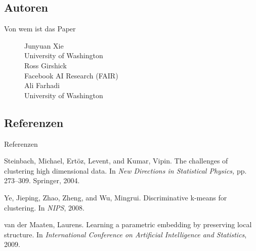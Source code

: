 \documentclass{beamer}
\begin{document}
\subsection{Autoren}
\begin{frame}[t]{Von wem ist das Paper}\vspace{30pt}
\begin{figure}
\center
\Large{Junyuan Xie}\\
University of Washington\\
\vspace{8pt}
\Large{Ross Girshick}\\
Facebook AI Research (FAIR)\\
\vspace{8pt}
\Large{Ali Farhadi}\\
University of Washington\\
\end{figure}
\end{frame}


\subsection{Referenzen}
\begin{frame}[t]{Referenzen}\vspace{4pt}
\begin{thebibliography}{10}
Steinbach, Michael, Ertöz, Levent, and Kumar, Vipin.
The challenges of clustering high dimensional data. In
\textit{New Directions in Statistical Physics,} pp. 273–309. Springer, 2004.

Ye, Jieping, Zhao, Zheng, and Wu, Mingrui. Discriminative k-means for clustering. In \textit{NIPS}, 2008.

van der Maaten, Laurens. Learning a parametric embedding by preserving local structure. In \textit{International Conference on Artificial Intelligence and Statistics}, 2009.
\end{thebibliography}
\end{frame}
\end{document}
